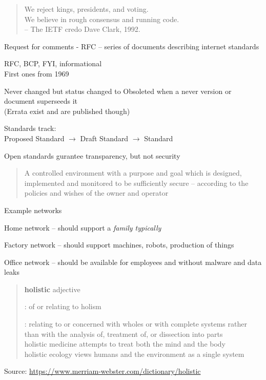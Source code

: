 \documentclass[Screen16to9,17pt]{foils}
\begin{document}

\begin{quote}
We reject kings, presidents, and voting.\\
We believe in rough consensus and running code.\\
-- The IETF credo Dave Clark, 1992.
\end{quote}

\begin{list2}
\item Request for comments - RFC -- series of documents describing internet standards
\item RFC, BCP, FYI, informational\\
First ones from 1969
\item Never changed but status changed to Obsoleted when a never version or document superseeds it\\
(Errata exist and are published though)
\item Standards track:\\
Proposed Standard $\rightarrow$ Draft Standard $\rightarrow$ Standard
\item  Open standards gurantee transparency, but not security
\end{list2}





\begin{quote}
A controlled environment with a purpose and goal which is designed, implemented and monitored to be sufficiently secure -- according to the policies and wishes of the owner and operator
\end{quote}

Example networks
\begin{list2}
\item Home network -- should support a \emph{family typically}
\item Factory network -- should support machines, robots, production of things
\item Office network -- should be available for employees and without malware and data leaks
\end{list2}


\begin{quote}
{\bf\Large holistic} adjective

\begin{list2}
\item[1]: of or relating to holism
\item[2] : relating to or concerned with wholes or with complete systems rather than with the analysis of, treatment of, or dissection into parts\\
holistic medicine attempts to treat both the mind and the body\\
holistic ecology views humans and the environment as a single system
\end{list2}
\end{quote}
Source: \url{https://www.merriam-webster.com/dictionary/holistic}
\end{document}
